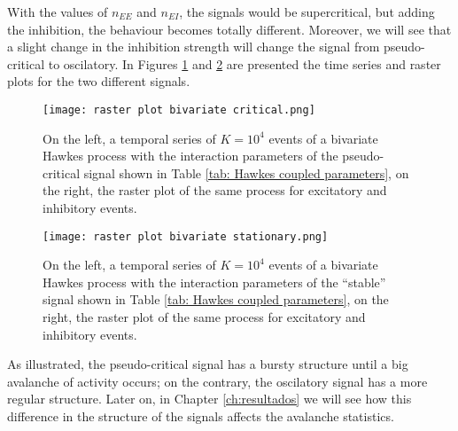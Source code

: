 With the values of $n_{EE}$ and $n_{EI}$, the signals would be supercritical, but adding the inhibition, the behaviour becomes totally different. Moreover, we will see that a 
slight change in the inhibition strength will change the signal from pseudo-critical to oscilatory. In Figures \ref{f: Hawkes coupled pseudo} and \ref{f: Hawkes coupled oscilatory}
are presented the time series and raster plots for the two different signals.

\begin{figure}[H]
    \centering
    \texttt{[image: raster plot bivariate critical.png]}
    \caption{On the left, a temporal series of $K=10^4$ events of a bivariate Hawkes process with the interaction parameters of the pseudo-critical signal shown in Table \ref{tab: Hawkes coupled parameters},
    on the right, the raster plot of the same process for excitatory and inhibitory events.}
    \label{f: Hawkes coupled pseudo}
\end{figure}

\begin{figure}[H]
    \centering
    \texttt{[image: raster plot bivariate stationary.png]}
    \caption{On the left, a temporal series of $K=10^4$ events of a bivariate Hawkes process with the interaction parameters of the ``stable'' signal shown in Table \ref{tab: Hawkes coupled parameters},
    on the right, the raster plot of the same process for excitatory and inhibitory events.}
    \label{f: Hawkes coupled oscilatory}
\end{figure}

As illustrated, the pseudo-critical signal has a bursty structure until a big avalanche of activity occurs; on the contrary, the oscilatory signal has a more regular structure. Later on,
in Chapter \ref{ch:resultados} we will see how this difference in the structure of the signals affects the avalanche statistics.